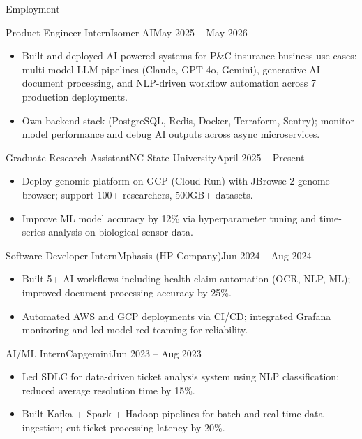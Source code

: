 \documentclass[]{mcdowellcv}
\begin{document}
\makeheader

\begin{cvsection}{Employment}
  \begin{cvsubsection}{Product Engineer Intern}{Isomer AI}{May 2025 -- May 2026}
    \begin{itemize}
      \item Built and deployed AI-powered systems for P\&C insurance business use cases: multi-model LLM pipelines (Claude, GPT-4o, Gemini), generative AI document processing, and NLP-driven workflow automation across 7 production deployments.
      \item Own backend stack (PostgreSQL, Redis, Docker, Terraform, Sentry); monitor model performance and debug AI outputs across async microservices.
    \end{itemize}
    \vspace{-1.5pt}
  \end{cvsubsection}

  \begin{cvsubsection}{Graduate Research Assistant}{NC State University}{April 2025 -- Present}
    \begin{itemize}
      \item Deploy genomic platform on GCP (Cloud Run) with JBrowse 2 genome browser; support 100+ researchers, 500GB+ datasets.
      \item Improve ML model accuracy by 12\% via hyperparameter tuning and time-series analysis on biological sensor data.
    \end{itemize}
    \vspace{-1.5pt}
  \end{cvsubsection}

  \begin{cvsubsection}{Software Developer Intern}{Mphasis (HP Company)}{Jun 2024 -- Aug 2024}
    \begin{itemize}
      \item Built 5+ AI workflows including health claim automation (OCR, NLP, ML); improved document processing accuracy by 25\%.
      \item Automated AWS and GCP deployments via CI/CD; integrated Grafana monitoring and led model red-teaming for reliability.
    \end{itemize}
    \vspace{-1.5pt}
  \end{cvsubsection}

  \begin{cvsubsection}{AI/ML Intern}{Capgemini}{Jun 2023 -- Aug 2023}
    \begin{itemize}
      \item Led SDLC for data-driven ticket analysis system using NLP classification; reduced average resolution time by 15\%.
      \item Built Kafka + Spark + Hadoop pipelines for batch and real-time data ingestion; cut ticket-processing latency by 20\%.
    \end{itemize}
    \vspace{-1.5pt}
  \end{cvsubsection}
\end{cvsection}
\end{document}
